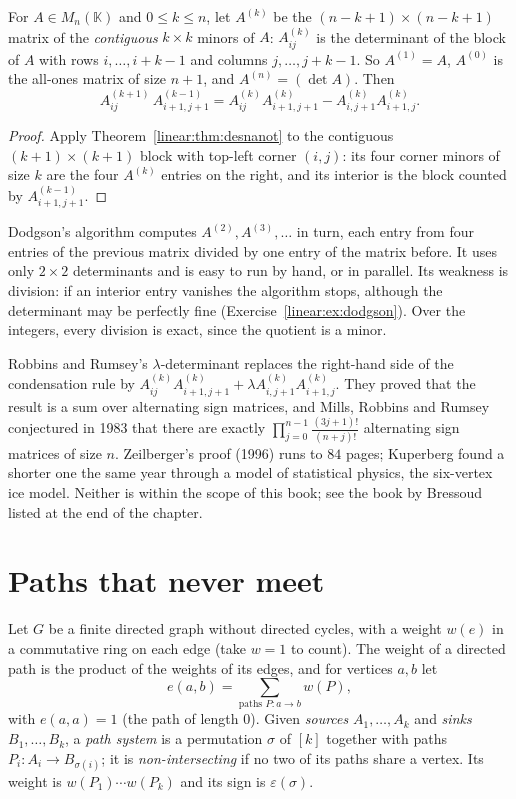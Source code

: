 \begin{corollary}\label{linear:cor:dodgson}
For $A\in M_n(\mathbb K)$ and $0\le k\le n$, let $A^{(k)}$ be the $(n-k+1)\times(n-k+1)$ matrix of the \emph{contiguous}
$k\times k$ minors of $A$: $A^{(k)}_{ij}$ is the determinant of the block of $A$ with rows $i,\dots,i+k-1$ and columns
$j,\dots,j+k-1$. So $A^{(1)}=A$, $A^{(0)}$ is the all-ones matrix of size $n+1$, and $A^{(n)}=(\det A)$. Then
\[
A^{(k+1)}_{ij}\,A^{(k-1)}_{i+1,j+1}=A^{(k)}_{ij}A^{(k)}_{i+1,j+1}-A^{(k)}_{i,j+1}A^{(k)}_{i+1,j}.
\]
\end{corollary}
\begin{proof}
Apply Theorem~\ref{linear:thm:desnanot} to the contiguous $(k+1)\times(k+1)$ block with top-left corner $(i,j)$: its four corner
minors of size $k$ are the four $A^{(k)}$ entries on the right, and its interior is the block counted by
$A^{(k-1)}_{i+1,j+1}$.
\end{proof}

Dodgson's algorithm computes $A^{(2)},A^{(3)},\dots$ in turn, each entry from four entries of the previous matrix
divided by one entry of the matrix before. It uses only $2\times2$ determinants and is easy to run by hand, or in
parallel. Its weakness is division: if an interior entry vanishes the algorithm stops, although the determinant may
be perfectly fine (Exercise~\ref{linear:ex:dodgson}). Over the integers, every division is exact, since the quotient is a
minor.

\begin{remark}
Robbins and Rumsey's $\lambda$-determinant replaces the right-hand side of the condensation rule by
$A^{(k)}_{ij}A^{(k)}_{i+1,j+1}+\lambda A^{(k)}_{i,j+1}A^{(k)}_{i+1,j}$. They proved that the result is a sum over
alternating sign matrices, and Mills, Robbins and Rumsey conjectured in 1983 that there are exactly
$\prod_{j=0}^{n-1}\frac{(3j+1)!}{(n+j)!}$ alternating sign matrices of size $n$. Zeilberger's proof (1996) runs to $84$
pages; Kuperberg found a shorter one the same year through a model of statistical physics, the six-vertex ice model.
Neither is within the scope of this book; see the book by Bressoud listed at the end of the chapter.
\end{remark}

\section{Paths that never meet}\label{linear:sec:lgv}

Let $G$ be a finite directed graph without directed cycles, with a weight $w(e)$ in a commutative ring on each edge
(take $w=1$ to count). The weight of a directed path is the product of the weights of its edges, and for vertices $a,b$
let
\[
e(a,b)=\sum_{\text{paths }P:a\to b}w(P),
\]
with $e(a,a)=1$ (the path of length $0$). Given \emph{sources} $A_1,\dots,A_k$ and \emph{sinks} $B_1,\dots,B_k$, a
\emph{path system} is a permutation $\sigma$ of $[k]$ together with paths $P_i:A_i\to B_{\sigma(i)}$; it is
\emph{non-intersecting} if no two of its paths share a vertex. Its weight is $w(P_1)\cdots w(P_k)$ and its sign is
$\varepsilon(\sigma)$.

